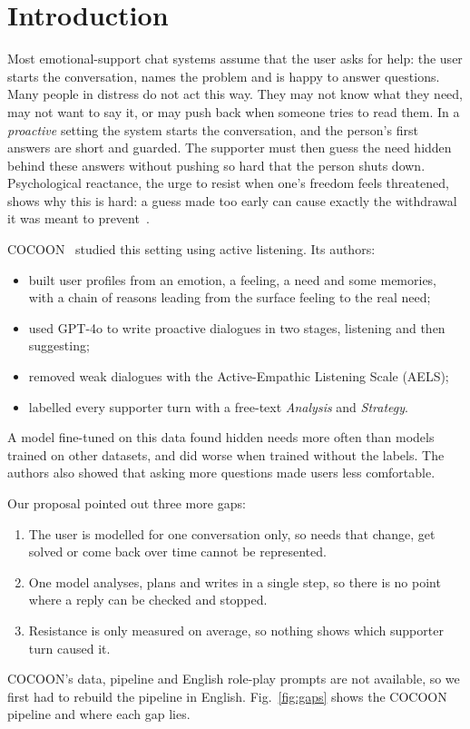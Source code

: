 \documentclass[journal]{IEEEtran}
\begin{document}
\section{Introduction}
Most emotional-support chat systems assume that the user asks for help: the user starts the conversation, names the problem and is happy to answer questions. Many people in distress do not act this way. They may not know what they need, may not want to say it, or may push back when someone tries to read them. In a \emph{proactive} setting the system starts the conversation, and the person's first answers are short and guarded. The supporter must then guess the need hidden behind these answers without pushing so hard that the person shuts down. Psychological reactance, the urge to resist when one's freedom feels threatened, shows why this is hard: a guess made too early can cause exactly the withdrawal it was meant to prevent~\cite{dillard2005}.

COCOON~\cite{fu2025} studied this setting using active listening. Its authors:
\begin{itemize}
\item built user profiles from an emotion, a feeling, a need and some memories, with a chain of reasons leading from the surface feeling to the real need;
\item used GPT-4o to write proactive dialogues in two stages, listening and then suggesting;
\item removed weak dialogues with the Active-Empathic Listening Scale (AELS);
\item labelled every supporter turn with a free-text \emph{Analysis} and \emph{Strategy}.
\end{itemize}
A model fine-tuned on this data found hidden needs more often than models trained on other datasets, and did worse when trained without the labels. The authors also showed that asking more questions made users less comfortable.

Our proposal pointed out three more gaps:
\begin{enumerate}
\item The user is modelled for one conversation only, so needs that change, get solved or come back over time cannot be represented.
\item One model analyses, plans and writes in a single step, so there is no point where a reply can be checked and stopped.
\item Resistance is only measured on average, so nothing shows which supporter turn caused it.
\end{enumerate}
COCOON's data, pipeline and English role-play prompts are not available, so we first had to rebuild the pipeline in English. Fig.~\ref{fig:gaps} shows the COCOON pipeline and where each gap lies.
\end{document}
